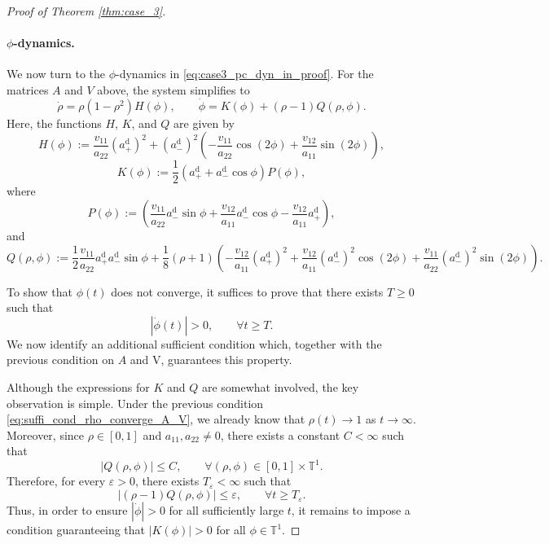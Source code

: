 \documentclass[10pt]{article}
\theoremstyle{definition}
\theoremstyle{definition}
\numberwithin{equation}{section}
\newcommand{\BBT}{\mathbb{T}}
\newcommand{\aDPlus}{a_+^{\text{d}}}
\newcommand{\aDMinus}{a_-^{\text{d}}}
\newcommand{\Drho}{\Dot{\rho}}
\newcommand{\Dphi}{\Dot{\phi}}
\begin{document}
\begin{proof}[Proof of Theorem \ref{thm:case_3}]
\paragraph{$\phi$-dynamics.}
We now turn to the $\phi$-dynamics in \eqref{eq:case3_pc_dyn_in_proof}.
For the matrices $A$ and $V$ above, the system simplifies to
\begin{equation}\label{eq:case3_pc_dyn_in_proof}
\Drho = \rho (1 - \rho^2) H(\phi), \qquad \Dphi = K(\phi) + (\rho-1) Q(\rho, \phi) .
\end{equation}
Here, the functions $H$, $K$, and $Q$ are given by
\begin{equation}\label{eq:case3_func_H}
H(\phi) := \frac{v_{11}}{a_{22}} (\aDPlus)^2 + (\aDMinus)^2 \left( -\frac{v_{11}}{a_{22}} \cos (2\phi) + \frac{v_{12}}{a_{11}} \sin (2\phi) \right),
\end{equation}
\begin{equation}\label{eq:case3_func_K}
K(\phi) := \frac{1}{2} \left( \aDPlus + \aDMinus \cos \phi \right) P(\phi),
\end{equation}
where
\begin{equation}
    P(\phi) :=\left( \frac{v_{11}}{a_{22}} \aDMinus \sin \phi + \frac{v_{12}}{a_{11}} \aDMinus \cos \phi - \frac{v_{12}}{a_{11}} \aDPlus \right),
\end{equation}
and
\begin{equation}\label{eq:case3_func_Q}
Q(\rho, \phi) := \frac{1}{2} \frac{v_{11}}{a_{22}} \aDPlus \aDMinus \sin \phi + \frac{1}{8} (\rho + 1) \left( - \frac{v_{12}}{a_{11}} (\aDPlus)^2 + \frac{v_{12}}{a_{11}} (\aDMinus)^2 \cos (2\phi) + \frac{v_{11}}{a_{22}} (\aDMinus)^2 \sin (2\phi) \right) .
\end{equation}

To show that $\phi(t)$ does not converge, it suffices to prove that there exists $T \geq 0$ such that 
\[
|\Dphi(t)| > 0, \qquad \forall t \geq T .
\]
We now identify an additional sufficient condition which, together with the previous condition on $A$ and V, guarantees this property.

Although the expressions for $K$ and $Q$ are somewhat involved, the key observation is simple.
Under the previous condition \eqref{eq:suffi_cond_rho_converge_A_V}, we already know that $\rho(t) \rightarrow 1$ as $t \rightarrow \infty$.
Moreover, since $\rho \in [0,1]$ and $a_{11}, a_{22} \neq 0$, there exists a constant $C < \infty$ such that 
\begin{equation*}
|Q(\rho, \phi)| \leq C, \qquad \forall (\rho, \phi) \in [0,1] \times \BBT^1 .
\end{equation*}
Therefore, for every $\varepsilon > 0$, there exists $T_{\varepsilon} < \infty$ such that 
\begin{equation*}
|(\rho - 1) Q(\rho, \phi)| \leq \varepsilon, \qquad \forall t \geq T_{\varepsilon} .
\end{equation*}
Thus, in order to ensure $|\Dphi| > 0$ for all sufficiently large $t$, it remains to impose a condition guaranteeing that $|K(\phi)| > 0$ for all $\phi \in \BBT^1$.


\end{proof}
\end{document}
